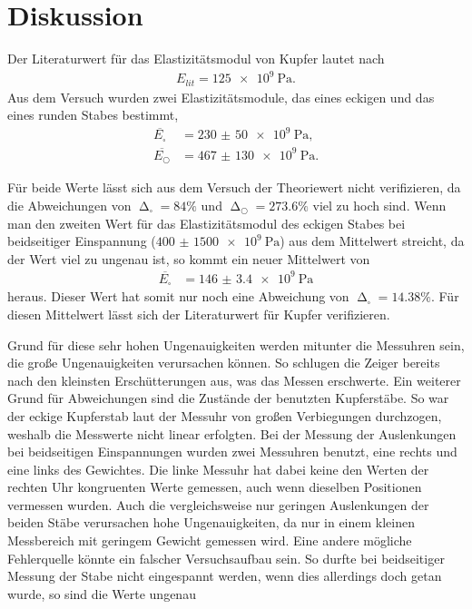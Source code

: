 \section{Diskussion}
\label{sec:Diskussion}

Der Literaturwert für das Elastizitätsmodul von Kupfer lautet nach \cite{czichos}
\begin{align*}
    E_{lit} = \SI{125e9}{\Pa}.
\end{align*}
Aus dem Versuch wurden zwei Elastizitätsmodule, das eines eckigen und das eines runden Stabes bestimmt,
\begin{align*}
    \overline{E_{\square}} &= \SI{230(50)e9}{\Pa}, \\
    \overline{E_{\bigcirc}} &= \SI{467(130)e9}{\Pa}.
\end{align*}

\sloppy
Für beide Werte lässt sich aus dem Versuch der Theoriewert nicht verifizieren, da die Abweichungen von
$\upDelta_{\square} = 84 \%$ und $\upDelta_{\bigcirc} = 273.6 \%$ viel zu hoch sind.
Wenn man den zweiten Wert für das Elastizitätsmodul des eckigen Stabes bei beidseitiger Einspannung ($\SI{400(1500)e9}{\Pa}$)
aus dem Mittelwert streicht, da der Wert viel zu ungenau ist, so kommt ein neuer Mittelwert von
\begin{align*}
    \overline{E_{\square}} &= \SI{146(3.4)e9}{\Pa}
\end{align*}
heraus. Dieser Wert hat somit nur noch eine Abweichung von $\upDelta_{\square} = 14.38 \%$.
Für diesen Mittelwert lässt sich der Literaturwert für Kupfer verifizieren.

Grund für diese sehr hohen Ungenauigkeiten werden mitunter die Messuhren sein, die große Ungenauigkeiten verursachen können.
So schlugen die Zeiger bereits nach den kleinsten Erschütterungen aus, was das Messen erschwerte. 
Ein weiterer Grund für Abweichungen sind die Zustände der benutzten Kupferstäbe. So war der eckige Kupferstab laut der Messuhr
von großen Verbiegungen durchzogen, weshalb die Messwerte nicht linear erfolgten.
Bei der Messung der Auslenkungen bei beidseitigen Einspannungen wurden zwei Messuhren benutzt, eine rechts und eine links des Gewichtes.
Die linke Messuhr hat dabei keine den Werten der rechten Uhr kongruenten Werte gemessen, auch wenn dieselben Positionen vermessen wurden.
Auch die vergleichsweise nur geringen Auslenkungen der beiden Stäbe verursachen hohe Ungenauigkeiten, da nur in einem
kleinen Messbereich mit geringem Gewicht gemessen wird.
Eine andere mögliche Fehlerquelle könnte ein falscher Versuchsaufbau sein. So durfte bei beidseitiger Messung der Stabe nicht
eingespannt werden, wenn dies allerdings doch getan wurde, so sind die Werte ungenau


